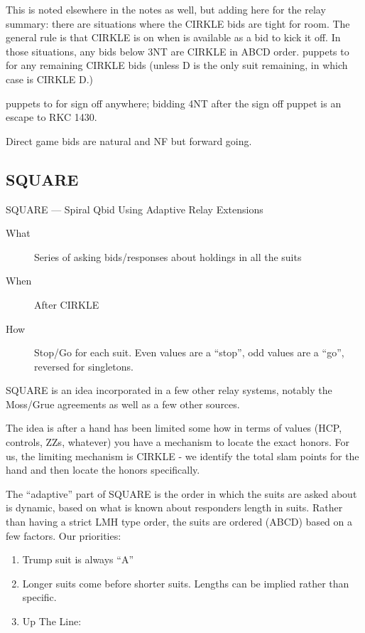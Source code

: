 \documentclass[tom-ari]{subfile}
\begin{document}
This is noted elsewhere in the notes as well, but adding here for the relay summary: there are situations where the CIRKLE bids are tight for room.  The general rule is that CIRKLE is on when  is available as a bid to kick it off.  In those situations, any bids below 3NT are CIRKLE in ABCD order.  puppets to  for any remaining CIRKLE bids (unless D is the only suit remaining, in which case  is CIRKLE D.) 

 puppets to  for sign off anywhere; bidding 4NT after the sign off puppet is an escape to RKC 1430. 

Direct game bids are natural and NF but forward going.

\subsection{SQUARE}

SQUARE --- Spiral Qbid Using Adaptive Relay Extensions

\normalsize


\begin{description}
	\item[What] Series of asking bids/responses about holdings in all the suits
	\item[When] After CIRKLE
	\item[How] Stop/Go for each suit.  Even values are a ``stop'', odd values are a ``go'', reversed for singletons.  
\end{description}

SQUARE is an idea incorporated in a few other relay systems, notably the Moss/Grue agreements as well as a few other sources. 

The idea is after a hand has been limited some how in terms of values (HCP, controls, ZZs, whatever) you have a mechanism to locate the exact honors.  For us, the limiting mechanism is CIRKLE - we identify the total slam points for the hand and then locate the honors specifically.

The ``adaptive'' part of SQUARE is the order in which the suits are asked about is dynamic, based on what is known about responders length in suits.  Rather than having a strict LMH type order, the suits are ordered (ABCD) based on a few factors. Our priorities:

\begin{enumerate}
	\item Trump suit is always ``A''
	\item Longer suits come before shorter suits. Lengths can be implied rather than specific.
	\item Up The Line: \clubsuit \diamondsuit \heartsuit \spadesuit 
\end{enumerate}
\end{document}
